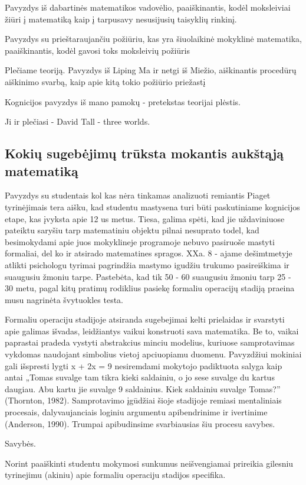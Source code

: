\documentclass{article}
\begin{document}
Pavyzdys iš dabartinės matematikos vadovėlio, paaiškinantis, kodėl moksleiviai žiūri į matematiką kaip į tarpusavy nesusijusių taisyklių rinkinį.

Pavyzdys su prieštaraujančiu požiūriu, kas yra šiuolaikinė mokyklinė matematika, paaiškinantis, kodėl gavosi toks moksleivių požiūris

Plečiame teoriją. Pavyzdys iš Liping Ma ir netgi iš Miežio, aiškinantis procedūrų aiškinimo svarbą, kaip apie kitą tokio požiūrio priežastį

Kognicijos pavyzdys iš mano pamokų - pretekstas teorijai plėstis.

Ji ir plečiasi -  David Tall - three worlds.


\subsection{Kokių sugebėjimų trūksta mokantis aukštąją matematiką}
Pavyzdys su studentais kol kas nėra tinkamas analizuoti remiantis Piaget tyrinėjimais tera aišku, kad studentu
mastysena turi būti paskutiniame kognicijos etape, kas įvyksta apie 12 us metus. Tiesa, galima spėti, kad jie uždaviniuose pateiktu saryšiu tarp matematiniu objektu pilnai nesuprato todel, kad besimokydami apie juos mokyklineje programoje
nebuvo pasiruoše mastyti formaliai, del ko ir atsirado matematines spragos. XXa. 8 - ajame dešimtmetyje atlikti psichologu tyrimai pagrindžia mastymo igudžiu trukumo pasireiškima ir suaugusiu žmoniu tarpe. Pastebėta, kad tik 50 - 60%
suaugusiu žmoniu tarp 25 - 30 metu, pagal kitų pratimų rodiklius pasiekę formaliu operacijų stadiją praeina musu
nagrinėta švytuokles testa. 

Formaliu operaciju stadijoje atsiranda sugebejimai kelti prielaidas ir svarstyti apie galimas išvadas, leidžiantys
vaikui konstruoti sava matematika. Be to, vaikai paprastai pradeda vystyti abstrakcius minciu modelius,
kuriuose samprotavimas vykdomas naudojant simbolius vietoj apciuopiamu duomenu. Pavyzdžiui mokiniai gali
išspresti lygti x + 2x = 9 nesiremdami mokytojo padiktuota salyga kaip antai „Tomas suvalge tam tikra kieki
saldainiu, o jo sese suvalge du kartus daugiau. Abu kartu jie suvalge 9 saldainius. Kiek saldainiu suvalge
Tomas?” (Thornton, 1982). Samprotavimo įgūdžiai šioje stadijoje remiasi mentaliniais procesais, dalyvaujanciais
loginiu argumentu apibendrinime ir ivertinime (Anderson, 1990). Trumpai apibudinsime svarbiausias šiu
procesu savybes.

Savybės.

Norint paaiškinti studentu mokymosi sunkumus neišvengiamai prireikia gilesniu
tyrinejimu (akiniu) apie formaliu operaciju stadijos specifika.
\end{document}
